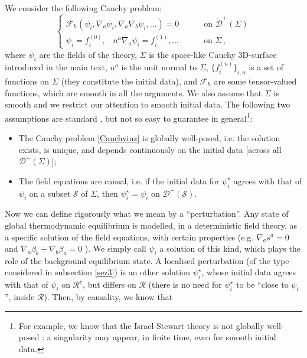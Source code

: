 \documentclass[a4paper, amsfonts, amssymb, amsmath, reprint, showkeys,  twoside, onecolumn,notitlepage,nofootinbib]{revtex4-1}
\newcommand{\spc}{\quad \quad \quad}
\theoremstyle{definition}
\theoremstyle{theorem}
\begin{document}
We consider the following Cauchy problem:
\begin{equation}\label{Cauchyiuz}
\begin{cases}
   \mathcal{F}_h(\psi_i, \nabla_a \psi_i , \nabla_a \nabla_b \psi_i, ...)=0 \spc \text{on }\mathring{\mathcal{D}}^+(\Sigma) \\
  \psi_i=f^{(0)}_i, \, \, \, \,\, n^a\nabla_a \psi_i = f^{(1)}_i,... \spc \text{on }\Sigma \, ,
  \end{cases}
\end{equation}
where $\psi_i$ are the fields of the theory, $\Sigma$ is the space-like Cauchy 3D-surface introduced in the main text, $n^a$ is the unit normal to $\Sigma$, $\{ f^{(n)}_i \}_{i,n}$ is a set of functions on $\Sigma$ (they constitute the initial data), and $\mathcal{F}_h$ are some tensor-valued functions, which are smooth in all the arguments. We also assume that $\Sigma$ is smooth and we restrict our attention to smooth initial data. The following two assumptions are standard \cite{Wald}, but not so easy to guarantee in general\footnote{For example, we know that the Israel-Stewart theory is not globally well-posed \cite{DisonziISbraks2020}: a singularity may appear, in finite time, even for smooth initial data.}:
\begin{itemize}
\item The Cauchy problem \eqref{Cauchyiuz} is globally well-posed, i.e. the solution exists, is unique, and depends continuously on the initial data [across all $\mathcal{D}^+(\Sigma)$];
\item The field equations are causal, i.e. if the initial data for $\psi_i^\star$ agrees with that of $\psi_i$ on a subset $\mathcal{S}$ of $\Sigma$, then $\psi_i^\star=\psi_i$ on $\mathcal{D}^+(\mathcal{S})$.
\end{itemize}
Now we can define rigorously what we mean by a ``perturbation''. Any state of global thermodynamic equilibrium is modelled, in a deterministic field theory, as a specific solution of the field equations, with certain properties (e.g. $\nabla_a s^a=0$ and $\nabla_a \beta_b+\nabla_b \beta_a =0$ \cite{Israel_Stewart_1979}). We simply call $\psi_i$ a solution of this kind, which plays the role of the background equilibrium state. A localised perturbation (of the type considered in subsection \ref{sez3}) is an other solution $\psi_i^\star$, whose initial data agrees with that of $\psi_i$ on $\mathcal{R}^c$, but differs on $\mathcal{R}$ (there is no need for $\psi_i^\star$ to be ``close to $\psi_i$'', inside $\mathcal{R}$). Then, by causality, we know that
\end{document}
